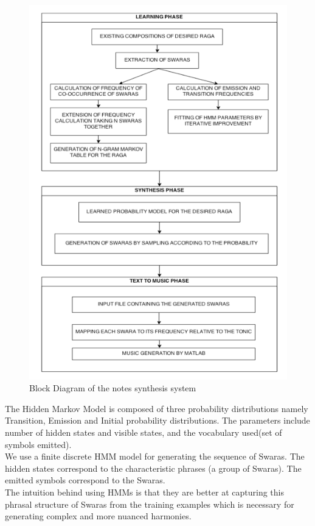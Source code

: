 \documentclass[journal]{IEEEtran}
\begin{document}
\begin{figure}[h]
\caption{Block Diagram of the notes synthesis system}
\includegraphics{flowchart}
\end{figure}

The Hidden Markov Model is composed of three probability distributions namely Transition, Emission and Initial probability distributions. The parameters include number of hidden states and visible states, and the vocabulary used(set of symbols emitted).\\

We use a finite discrete HMM model for generating the sequence of Swaras. The hidden states correspond to the characteristic phrases (a group of Swaras). The emitted symbols correspond to the Swaras.\\

The intuition behind using HMMs is that they are better at capturing this phrasal structure of Swaras from the training examples which is necessary for generating complex and more nuanced harmonies.\\
\end{document}
